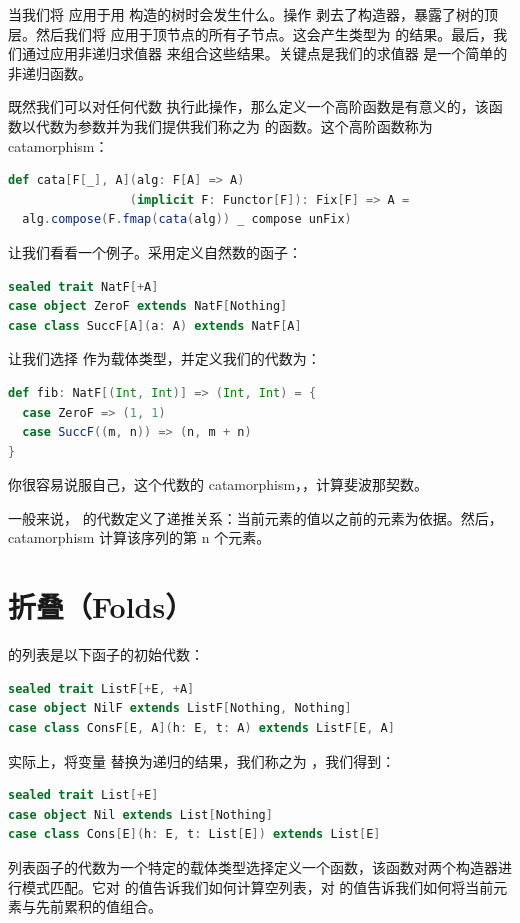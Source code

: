 当我们将  应用于用  构造的树时会发生什么。操作  剥去了构造器，暴露了树的顶层。然后我们将  应用于顶节点的所有子节点。这会产生类型为  的结果。最后，我们通过应用非递归求值器  来组合这些结果。关键点是我们的求值器  是一个简单的非递归函数。

既然我们可以对任何代数  执行此操作，那么定义一个高阶函数是有意义的，该函数以代数为参数并为我们提供我们称之为  的函数。这个高阶函数称为 catamorphism：

\begin{lstlisting}[language=Scala]
def cata[F[_], A](alg: F[A] => A)
                 (implicit F: Functor[F]): Fix[F] => A =
  alg.compose(F.fmap(cata(alg)) _ compose unFix)
\end{lstlisting}
让我们看看一个例子。采用定义自然数的函子：

\begin{lstlisting}[language=Scala]
sealed trait NatF[+A]
case object ZeroF extends NatF[Nothing]
case class SuccF[A](a: A) extends NatF[A]
\end{lstlisting}
让我们选择  作为载体类型，并定义我们的代数为：

\begin{lstlisting}[language=Scala]
def fib: NatF[(Int, Int)] => (Int, Int) = {
  case ZeroF => (1, 1)
  case SuccF((m, n)) => (n, m + n)
}
\end{lstlisting}
你很容易说服自己，这个代数的 catamorphism，，计算斐波那契数。

一般来说， 的代数定义了递推关系：当前元素的值以之前的元素为依据。然后，catamorphism 计算该序列的第 n 个元素。

\section{折叠（Folds）}

 的列表是以下函子的初始代数：

\begin{lstlisting}[language=Scala]
sealed trait ListF[+E, +A]
case object NilF extends ListF[Nothing, Nothing]
case class ConsF[E, A](h: E, t: A) extends ListF[E, A]
\end{lstlisting}
实际上，将变量  替换为递归的结果，我们称之为 ，我们得到：

\begin{lstlisting}[language=Scala]
sealed trait List[+E]
case object Nil extends List[Nothing]
case class Cons[E](h: E, t: List[E]) extends List[E]
\end{lstlisting}
列表函子的代数为一个特定的载体类型选择定义一个函数，该函数对两个构造器进行模式匹配。它对  的值告诉我们如何计算空列表，对  的值告诉我们如何将当前元素与先前累积的值组合。

